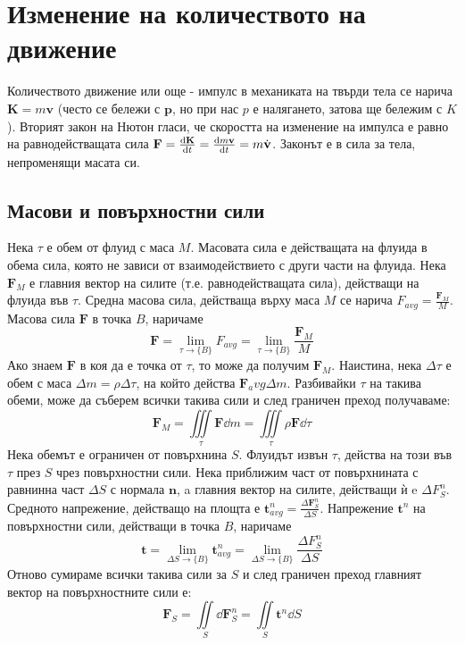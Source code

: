 \setcounter{equation}{0}
\section{Изменение на количеството на движение}
Количеството движение или още - импулс в механиката на твърди тела се нарича $\mathbf{K} = m\mathbf{v}$ (често се бележи с $\mathbf{p}$, но при нас $p$ е налягането, затова ще бележим с $K$).
Вторият закон на Нютон гласи, че скоростта на изменение на импулса е равно на равнодействащата сила $\mathbf{F} = \dv{\mathbf{K}}{t} = \dv{m\mathbf{v}}{t}= m \dot{\mathbf{v}}$. 
Законът е в сила за тела, непроменящи масата си.

\subsection{Масови и повърхностни сили}
Нека $\tau$ е обем от флуид с маса $M$. 
Масовата сила е действащата на флуида в обема сила, която не зависи от взаимодействието с други части на флуида. 
Нека $\mathbf{F}_M$ е главния вектор на силите (т.е. равнодействащата сила), действащи на флуида във $\tau$.
Средна масова сила, действаща върху маса $M$ се нарича $F_{avg} = \frac{\mathbf{F}_M}{M}$.
Масова сила $\mathbf{F}$ в точка $B$, наричаме
\begin{equation}
	\mathbf{F} = \lim_{\tau \to \{B\}} F_{avg} = \lim_{\tau \to \{B\}} \frac{\mathbf{F}_M}{M}
\end{equation}
Ако знаем $\mathbf{F}$ в коя да е точка от $\tau$, то може да получим $\mathbf{F}_M$.
Наистина, нека $\Delta \tau$ е обем с маса $\Delta m = \rho \Delta \tau$, на който действа $\mathbf{F}_avg \Delta m$.
Разбивайки $\tau$ на такива обеми, може да съберем всички такива сили и след граничен преход получаваме:
\begin{equation}
	\mathbf{F}_M = \iiint\limits_{\tau} \mathbf{F} \dd m = \iiint\limits_{\tau} \rho \mathbf{F} \dd \tau
\end{equation}
Нека обемът е ограничен от повърхнина $S$. Флуидът извън $\tau$, действа на този във $\tau$ през $S$ чрез повърхностни сили.
Нека приближим част от повърхнината с равнинна част $\Delta S$ с нормала $\mathbf{n}$, a главния вектор на силите, действащи ѝ e $\Delta F_S^n$.
Средното напрежение, действащо на площта е $\mathbf{t}_{avg}^n = \frac{\Delta \mathbf{F}_S^n}{\Delta S}$. 
Напрежение $\mathbf{t}^n$ на повърхностни сили, действащи в точка $B$, наричаме
\begin{equation}
	\mathbf{t} = \lim_{\Delta S \to \{B\}} \mathbf{t}_{avg}^n = \lim_{\Delta S \to \{B\}} \frac{\Delta F_S^n}{\Delta S}
\end{equation}
Отново сумираме всички такива сили за $S$ и след граничен преход главният вектор на повърхностните сили е:
\begin{equation}
	\mathbf{F}_S = \iint\limits_{S} \dd \mathbf{F}_S^n = \iint\limits_{S} \mathbf{t}^n \dd S
\end{equation}

